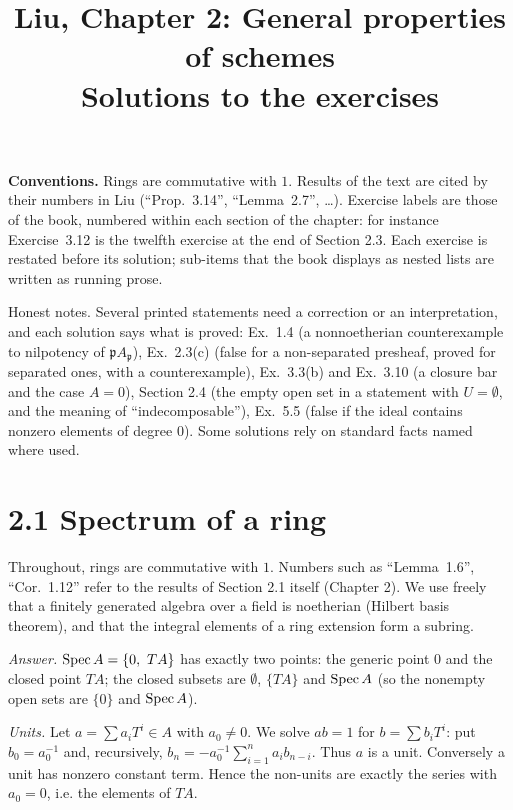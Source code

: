 \documentclass[11pt]{article}
\title{Liu, Chapter 2: General properties of schemes\\[2pt]\large Solutions to the exercises}
\author{}
\date{}
\begin{document}
\maketitle
\noindent\textbf{Conventions.} Rings are commutative with $1$. Results of the text are cited by their numbers in Liu (``Prop.~3.14'', ``Lemma~2.7'', \dots). Exercise labels are those of the book, numbered within each section of the chapter: for instance Exercise~3.12 is the twelfth exercise at the end of Section 2.3. Each exercise is restated before its solution; sub-items that the book displays as nested lists are written as running prose.

Honest notes. Several printed statements need a correction or an interpretation, and each solution says what is proved: Ex.~1.4 (a nonnoetherian counterexample to nilpotency of $\mathfrak pA_{\mathfrak p}$), Ex.~2.3(c) (false for a non-separated presheaf, proved for separated ones, with a counterexample), Ex.~3.3(b) and Ex.~3.10 (a closure bar and the case $A=0$), Section 2.4 (the empty open set in a statement with $U=\emptyset$, and the meaning of ``indecomposable''), Ex.~5.5 (false if the ideal contains nonzero elements of degree $0$). Some solutions rely on standard facts named where used.

\section*{2.1 Spectrum of a ring}

Throughout, rings are commutative with $1$. Numbers such as ``Lemma~1.6'', ``Cor.~1.12'' refer to the results of Section 2.1 itself (Chapter 2). We use freely that a finitely generated algebra over a field is noetherian (Hilbert basis theorem), and that the integral elements of a ring extension form a subring.

\pf
\emph{Answer.} $\Spec A=\{0,\ TA\}$ has exactly two points: the generic point $0$ and the closed point $TA$; the closed subsets are $\emptyset$, $\{TA\}$ and $\operatorname{Spec} A$ (so the nonempty open sets are $\{0\}$ and $\operatorname{Spec} A$).

\emph{Units.} Let $a=\sum a_iT^i\in A$ with $a_0\neq0$. We solve $ab=1$ for $b=\sum b_iT^i$: put $b_0=a_0^{-1}$ and, recursively, $b_n=-a_0^{-1}\sum_{i=1}^{n}a_ib_{n-i}$. Thus $a$ is a unit. Conversely a unit has nonzero constant term. Hence the non-units are exactly the series with $a_0=0$, i.e. the elements of $TA$.
\end{document}
